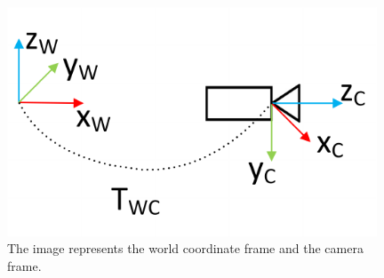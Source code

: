  
\begin{figure}
  \centering
  \includegraphics[width=0.98\textwidth]{images/world_cam_v2.pdf}
  \caption{The image represents the world coordinate frame and the camera frame.}
  \label{pics:worldcamframe}
\end{figure}
 
